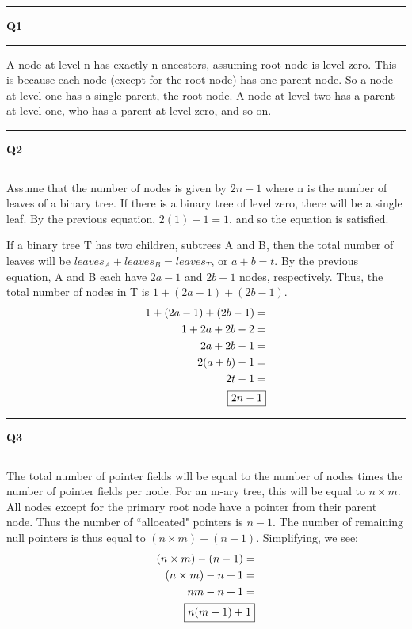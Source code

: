 \documentclass[11pt]{article}
\newcommand\question[2]{\vspace{.25in}\hrule\textbf{#1 #2}\vspace{.5em}\hrule\vspace{.10in}}
\begin{document}
\raggedright
\newcommand\NAME{Sean Connor}  %
\newcommand\HWNUM{6}              %

\question{Q1}{}
A node at level n has exactly n ancestors, assuming root node is level zero. This is because each node (except for the root node) has one parent node. So a node at level one has a single parent, the root node. A node at level two has a parent at level one, who has a parent at level zero, and so on.

\begin{center}
\end{center}

\question{Q2}{}
Assume that the number of nodes is given by $2n-1$ where n is the number of leaves of a binary tree. If there is a binary tree of level zero, there will be a single leaf. By the previous equation, $2(1)-1 = 1$, and so the equation is satisfied. 

If a binary tree T has two children, subtrees A and B, then the total number of leaves will be $leaves_A + leaves_B = leaves_T$, or $a + b = t$. By the previous equation, A and B each have $2a-1$ and $2b-1$ nodes, respectively. Thus, the total number of nodes in T is $1+(2a-1)+(2b-1)$.
\begin{align*}
1+(2a-1)+(2b-1) = \\
1+2a+2b-2 = \\
2a+2b-1 = \\
2(a+b)-1 = \\
2t-1 = \\
\fbox{$2n-1$}
\end{align*}

\question{Q3}{}
The total number of pointer fields will be equal to the number of nodes times the number of pointer fields per node. For an m-ary tree, this will be equal to $n\times m$. All nodes except for the primary root node have a pointer from their parent node. Thus the number of ``allocated" pointers is $n-1$. The number of remaining null pointers is thus equal to $(n\times m)-(n-1)$. Simplifying, we see:
\begin{align*}
 (n\times m)-(n-1) = \\
(n\times m) - n + 1 = \\
nm - n + 1 = \\
\fbox{$n(m-1)+1$}
\end{align*}
\end{document}

